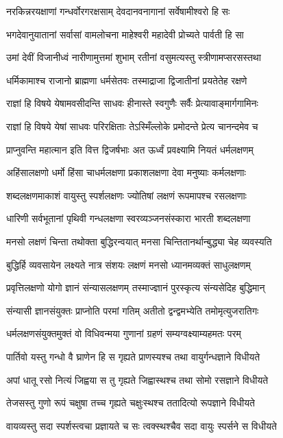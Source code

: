 \twolineshloka
{नरकिन्नरयक्षाणां गन्धर्वोरगरक्षसाम्}
{देवदानवनागानां सर्वेषामीश्वरो हि सः}


\twolineshloka
{भगदेवानुयातानां सर्वासां वामलोचना}
{माहेश्वरी महादेवी प्रोच्यते पार्वती हि सा}


\twolineshloka
{उमां देवीं विजानीध्वं नारीणामुत्तमां शुभाम्}
{रतीनां वसुमत्यस्तु स्त्रीणामप्सरसस्तथा}


\twolineshloka
{धर्मिकामाश्च राजानो ब्राह्मणा धर्मसेतवः}
{तस्माद्राजा द्विजातीनां प्रयतेतेह रक्षणे}


\twolineshloka
{राज्ञां हि विषये येषामवसीदन्ति साधवः}
{हीनास्ते स्वगुणैः सर्वैः प्रेत्यावाङ्मार्गगामिनः}


\twolineshloka
{राज्ञां हि विषये येषां साधवः परिरक्षिताः}
{तेऽस्मिँल्लोके प्रमोदन्ते प्रेत्य चानन्दमेव च}


\twolineshloka
{प्राप्नुवन्ति महात्मान इति वित्त द्विजर्षभाः}
{अत ऊर्ध्वं प्रवक्ष्यामि नियतं धर्मलक्षणम्}


\twolineshloka
{अहिंसालक्षणो धर्मो हिंसा चाधर्मलक्षणा}
{प्रकाशलक्षणा देवा मनुष्याः कर्मलक्षणाः}


\twolineshloka
{शब्दलक्षणमाकाशं वायुस्तु स्पर्शलक्षणः}
{ज्योतिषां लक्षणं रूपमापश्च रसलक्षणाः}


\twolineshloka
{धारिणी सर्वभूतानां पृथिवी गन्धलक्षणा}
{स्वरव्यञ्जनसंस्कारा भारती शब्दलक्षणा}


\twolineshloka
{मनसो लक्षणं चिन्ता तथोक्ता बुद्धिरन्वयात्}
{मनसा चिन्तितानर्थान्बुद्ध्या चेह व्यवस्यति}


\twolineshloka
{बुद्धिर्हि व्यवसायेन लक्ष्यते नात्र संशयः}
{लक्षणं मनसो ध्यानमव्यक्तं साधुलक्षणम्}


\twolineshloka
{प्रवृत्तिलक्षणो योगो ज्ञानं संन्यासलक्षणम्}
{तस्माज्ज्ञानं पुरस्कृत्य संन्यसेदिह बुद्धिमान्}


\twolineshloka
{संन्यासी ज्ञानसंयुक्तः प्राप्नोति परमां गतिम्}
{अतीतो द्वन्द्वमभ्येति तमोमृत्युजरातिगः}


\twolineshloka
{धर्मलक्षणसंयुक्तमुक्तं वो विधिवन्मया}
{गुणानां ग्रहणं सम्यग्वक्ष्याम्यहमतः परम्}


\twolineshloka
{पार्तिवो यस्तु गन्धो वै घ्राणेन हि स गृह्यते}
{प्राणस्यश्च तथा वायुर्गन्धज्ञाने विधीयते}


\twolineshloka
{अपां धातू रसो नित्यं जिह्वया स तु गृह्यते}
{जिह्वास्थश्च तथा सोमो रसज्ञाने विधीयते}


\twolineshloka
{तेजसस्तु गुणो रूपं चक्षुषा तच्च गृह्यते}
{चक्षुःस्थश्च ततादित्यो रूपज्ञाने विधीयते}


\twolineshloka
{वायव्यस्तु सदा स्पर्शस्त्वचा प्रज्ञायते च सः}
{त्वक्स्थश्चैव सदा वायुः स्पर्सने स विधीयते}


